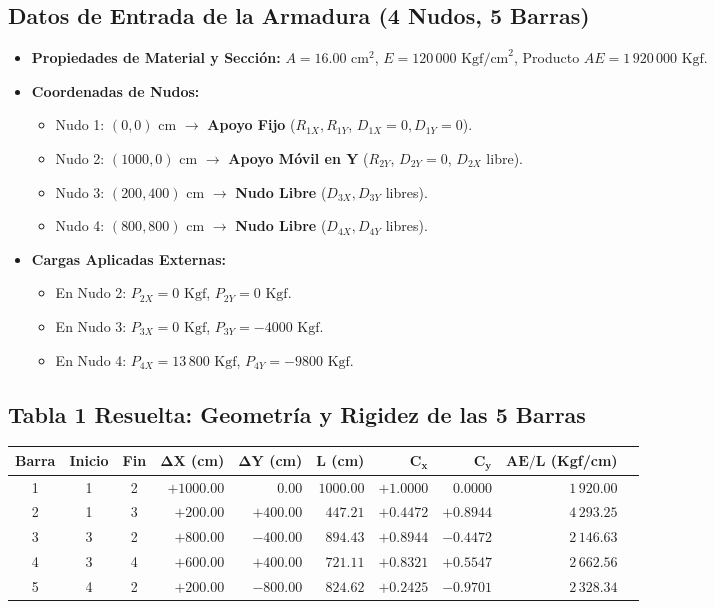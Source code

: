 \documentclass[10pt,a4paper]{article}
\begin{document}
\subsection{Datos de Entrada de la Armadura (4 Nudos, 5 Barras)}
\begin{itemize}
    \item \textbf{Propiedades de Material y Sección:} $A = 16.00\text{ cm}^2$, $E = 120\,000\text{ Kgf/cm}^2$, Producto $AE = 1\,920\,000\text{ Kgf}$.
    \item \textbf{Coordenadas de Nudos:}
    \begin{itemize}
        \item Nudo 1: $(0, 0)\text{ cm}$ $\to$ \textbf{Apoyo Fijo} ($R_{1X}, R_{1Y}$, $D_{1X}=0, D_{1Y}=0$).
        \item Nudo 2: $(1000, 0)\text{ cm}$ $\to$ \textbf{Apoyo Móvil en Y} ($R_{2Y}$, $D_{2Y}=0$, $D_{2X}$ libre).
        \item Nudo 3: $(200, 400)\text{ cm}$ $\to$ \textbf{Nudo Libre} ($D_{3X}, D_{3Y}$ libres).
        \item Nudo 4: $(800, 800)\text{ cm}$ $\to$ \textbf{Nudo Libre} ($D_{4X}, D_{4Y}$ libres).
    \end{itemize}
    \item \textbf{Cargas Aplicadas Externas:}
    \begin{itemize}
        \item En Nudo 2: $P_{2X} = 0\text{ Kgf}$, $P_{2Y} = 0\text{ Kgf}$.
        \item En Nudo 3: $P_{3X} = 0\text{ Kgf}$, $P_{3Y} = -4000\text{ Kgf}$.
        \item En Nudo 4: $P_{4X} = 13\,800\text{ Kgf}$, $P_{4Y} = -9800\text{ Kgf}$.
    \end{itemize}
\end{itemize}

\subsection{Tabla 1 Resuelta: Geometría y Rigidez de las 5 Barras}
\begin{center}
\small
\begin{tabular}{|c|c|c|r|r|r|r|r|r|r|}
\hline
\rowcolor{pastelGreen}
\textbf{Barra} & \textbf{Inicio} & \textbf{Fin} & $\mathbf{\Delta X}$ (cm) & $\mathbf{\Delta Y}$ (cm) & $\mathbf{L}$ (cm) & $\mathbf{C_x}$ & $\mathbf{C_y}$ & $\mathbf{AE/L}$ (Kgf/cm) \\
\hline
1 & 1 & 2 & $+1000.00$ & $0.00$ & $1000.00$ & $+1.0000$ & $0.0000$ & $1\,920.00$ \\
2 & 1 & 3 & $+200.00$ & $+400.00$ & $447.21$ & $+0.4472$ & $+0.8944$ & $4\,293.25$ \\
3 & 3 & 2 & $+800.00$ & $-400.00$ & $894.43$ & $+0.8944$ & $-0.4472$ & $2\,146.63$ \\
4 & 3 & 4 & $+600.00$ & $+400.00$ & $721.11$ & $+0.8321$ & $+0.5547$ & $2\,662.56$ \\
5 & 4 & 2 & $+200.00$ & $-800.00$ & $824.62$ & $+0.2425$ & $-0.9701$ & $2\,328.34$ \\
\hline
\end{tabular}
\end{center}
\end{document}
